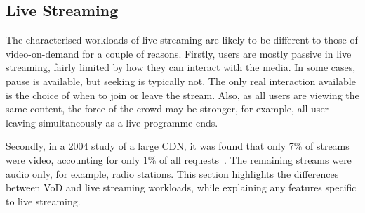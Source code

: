 \subsection{Live Streaming}




    The characterised workloads of live streaming are likely to be different to those of video-on-demand for a couple of reasons. Firstly, users are mostly passive in live streaming, fairly limited by how they can interact with the media. In some cases, pause is available, but seeking is typically not. The only real interaction available is the choice of when to join or leave the stream. Also, as all users are viewing the same content, the force of the crowd may be stronger, for example, all user leaving simultaneously as a live programme ends.

    Secondly, in a 2004 study of a large CDN, it was found that only 7\% of streams were video, accounting for only 1\% of all requests~\cite{sripanidkulchai2004als}. The remaining streams were audio only, for example, radio stations. This section highlights the differences between VoD and live streaming workloads, while explaining any features specific to live streaming.

%
%

